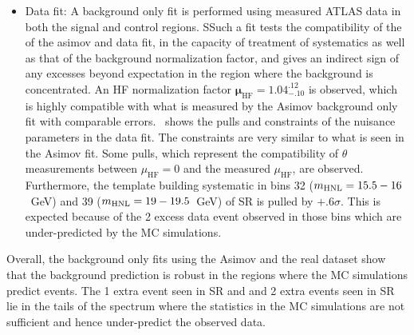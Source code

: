 \begin{itemize}
    \item Data fit: A background only fit is performed using measured ATLAS data in both the signal and control regions. SSuch a fit tests the compatibility of the of the asimov and data fit, in the capacity of treatment of systematics as well as that of the background normalization factor, and gives an indirect sign of any excesses beyond expectation in the region where the background is concentrated. An HF normalization factor $\mathbf{\mu_\mathrm{HF}=1.04^{.12}_{-.10}}$ is observed, which is highly compatible with what is measured by the Asimov background only fit with comparable errors.~ shows the pulls and constraints of the nuisance parameters in the data fit. The constraints are very similar to what is seen in the Asimov fit. Some pulls, which represent the compatibility of $\theta$ measurements between $\mu_\mathrm{HF}=0$ and the measured $\mu_\mathrm{HF}$, are observed. Furthermore, the template building systematic in bins 32 ($m_{\mathrm{HNL}}=15.5-16$~GeV) and 39 ($m_{\mathrm{HNL}}=19-19.5$~GeV) of SR \euu is pulled by $+.6\sigma$. This is expected because of the 2 excess data event observed in those bins which are under-predicted by the MC simulations.
\end{itemize}

Overall, the background only fits using the Asimov and the real dataset show that the background prediction is robust in the regions where the MC simulations predict events. The 1 extra event seen in SR \eeu and and 2 extra events seen in SR \euu lie in the tails of the \mhnl spectrum where the statistics in the MC simulations are not sufficient and hence under-predict the observed data.